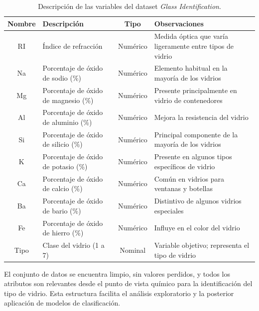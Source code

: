 \documentclass{article}
\begin{document}
\begin{table}[H]
    \centering
    \caption{Descripción de las variables del dataset \textit{Glass Identification}.}
    \label{tab:variables-glass}
    \begin{tabular}{|c|p{6cm}|c|p{5cm}|}
        \hline
        \textbf{Nombre} & \textbf{Descripción} & \textbf{Tipo} & \textbf{Observaciones} \\
        \hline
        RI & Índice de refracción & Numérico & Medida óptica que varía ligeramente entre tipos de vidrio \\
        \hline
        Na & Porcentaje de óxido de sodio (\%) & Numérico & Elemento habitual en la mayoría de los vidrios \\
        \hline
        Mg & Porcentaje de óxido de magnesio (\%) & Numérico & Presente principalmente en vidrio de contenedores \\
        \hline
        Al & Porcentaje de óxido de aluminio (\%) & Numérico & Mejora la resistencia del vidrio \\
        \hline
        Si & Porcentaje de óxido de silicio (\%) & Numérico & Principal componente de la mayoría de los vidrios \\
        \hline
        K  & Porcentaje de óxido de potasio (\%) & Numérico & Presente en algunos tipos específicos de vidrio \\
        \hline
        Ca & Porcentaje de óxido de calcio (\%) & Numérico & Común en vidrios para ventanas y botellas \\
        \hline
        Ba & Porcentaje de óxido de bario (\%) & Numérico & Distintivo de algunos vidrios especiales \\
        \hline
        Fe & Porcentaje de óxido de hierro (\%) & Numérico & Influye en el color del vidrio \\
        \hline
        Tipo & Clase del vidrio (1 a 7) & Nominal & Variable objetivo; representa el tipo de vidrio \\
        \hline
    \end{tabular}
\end{table}

El conjunto de datos se encuentra limpio, sin valores perdidos, y todos los atributos son relevantes desde el punto de vista químico para la identificación del tipo de vidrio. Esta estructura facilita el análisis exploratorio y la posterior aplicación de modelos de clasificación.\\
\end{document}

